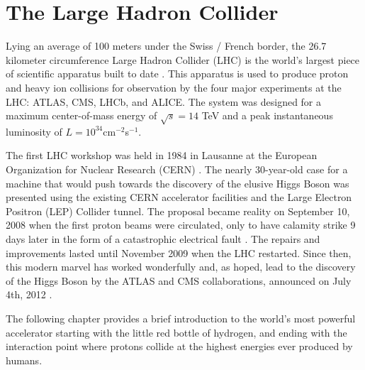 \chapter{The Large Hadron Collider} \label{chap:lhc}

Lying an average of 100 meters under the Swiss / French border, the 26.7
kilometer circumference Large Hadron Collider (LHC) is the world's largest piece
of scientific apparatus built to date \cite{Brüning:782076, Evans:2008zzb}.
This apparatus is used to produce proton and heavy ion collisions for
observation by the four major experiments at the LHC: ATLAS, CMS, LHCb, and
ALICE.  The system was designed for a maximum center-of-mass energy of
$\sqrt{s} = 14$ TeV and a peak instantaneous luminosity of $L = 10^{34} $cm$^{-2} $s$^{-1}$.  

The first LHC workshop was held in 1984 in Lausanne at the European
Organization for Nuclear Research (CERN) \cite{LlewellynSmith:2014lmn}.  The
nearly 30-year-old case for a machine that would push towards the discovery of
the elusive Higgs Boson was presented using the existing CERN accelerator
facilities and the Large Electron Positron (LEP) Collider tunnel. The proposal
became reality on September 10, 2008 when the first proton beams were
circulated, only to have calamity strike 9 days later in the form of a
catastrophic electrical fault \cite{EDMS:973073}. The repairs and improvements
lasted until November 2009 when the LHC restarted.  Since then, this modern
marvel has worked wonderfully and, as hoped, lead to the discovery of the Higgs
Boson by the ATLAS and CMS collaborations, announced on July 4th, 2012
\cite{Aad:2012tfa, Chatrchyan:2012xdj, higgs_announcement}.

The following  chapter provides a brief introduction to the world's most
powerful accelerator starting with the little red bottle of hydrogen, and
ending with the interaction point where protons collide at the highest energies
ever produced by humans.





